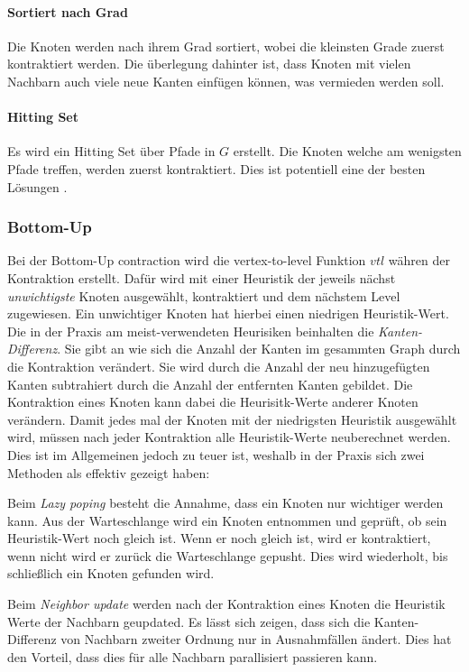 \paragraph{Sortiert nach Grad}
Die Knoten werden nach ihrem Grad sortiert, wobei die kleinsten Grade zuerst kontraktiert werden.
Die überlegung dahinter ist, dass Knoten mit vielen Nachbarn auch viele neue Kanten einfügen können, was vermieden werden soll.

\paragraph{Hitting Set}
Es wird ein Hitting Set über Pfade in $G$ erstellt.
Die Knoten welche am wenigsten Pfade treffen, werden zuerst kontraktiert.
Dies ist potentiell eine der besten Lösungen .

\subsubsection{Bottom-Up}

Bei der Bottom-Up contraction wird die vertex-to-level Funktion ${vtl}$ währen der Kontraktion erstellt.
Dafür wird mit einer Heuristik der jeweils nächst \emph{unwichtigste} Knoten ausgewählt, kontraktiert und dem nächstem Level zugewiesen.
Ein unwichtiger Knoten hat hierbei einen niedrigen Heuristik-Wert.
Die in der Praxis am meist-verwendeten Heurisiken beinhalten die \emph{Kanten-Differenz}.
Sie gibt an wie sich die Anzahl der Kanten im gesammten Graph durch die Kontraktion verändert.
Sie wird durch die Anzahl der neu hinzugefügten Kanten subtrahiert durch die Anzahl der entfernten Kanten gebildet.
Die Kontraktion eines Knoten kann dabei die Heurisitk-Werte anderer Knoten verändern.
Damit jedes mal der Knoten mit der niedrigsten Heuristik ausgewählt wird, müssen nach jeder Kontraktion alle Heuristik-Werte neuberechnet werden.
Dies ist im Allgemeinen jedoch zu teuer ist, weshalb in der Praxis sich zwei Methoden als effektiv gezeigt haben:

Beim \emph{Lazy poping} besteht die Annahme, dass ein Knoten nur wichtiger werden kann.
Aus der Warteschlange wird ein Knoten entnommen und geprüft, ob sein Heuristik-Wert noch gleich ist.
Wenn er noch gleich ist, wird er kontraktiert, wenn nicht wird er zurück die Warteschlange gepusht.
Dies wird wiederholt, bis schließlich ein Knoten gefunden wird.

Beim \emph{Neighbor update} werden nach der Kontraktion eines Knoten die Heuristik Werte der Nachbarn geupdated.
Es lässt sich zeigen, dass sich die Kanten-Differenz von Nachbarn zweiter Ordnung nur in Ausnahmfällen ändert. 
Dies hat den Vorteil, dass dies für alle Nachbarn parallisiert passieren kann.

